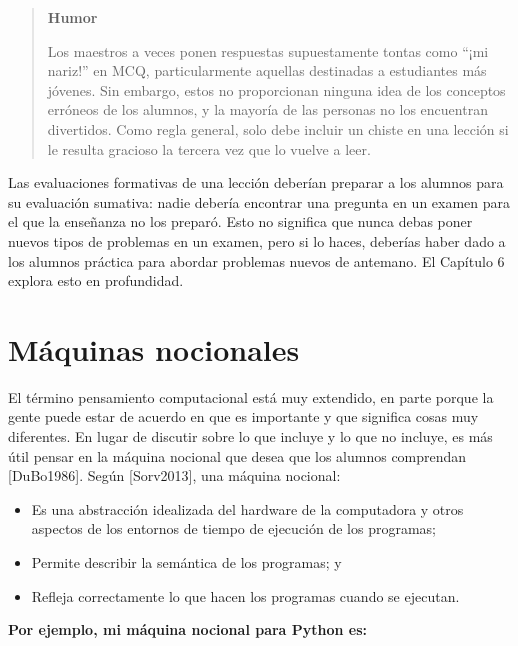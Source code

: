 \documentclass[
]{book}
\begin{document}
\begin{quote}
\textbf{Humor}

Los maestros a veces ponen respuestas supuestamente tontas como ``¡mi nariz!'' en MCQ, particularmente aquellas destinadas a estudiantes más jóvenes. Sin embargo, estos no proporcionan ninguna idea de los conceptos erróneos de los alumnos, y la mayoría de las personas no los encuentran divertidos. Como regla general, solo debe incluir un chiste en una lección si le resulta gracioso la tercera vez que lo vuelve a leer.
\end{quote}

Las evaluaciones formativas de una lección deberían preparar a los alumnos para su evaluación sumativa: nadie debería encontrar una pregunta en un examen para el que la enseñanza no los preparó. Esto no significa que nunca debas poner nuevos tipos de problemas en un examen, pero si lo haces, deberías haber dado a los alumnos práctica para abordar problemas nuevos de antemano. El Capítulo 6 explora esto en profundidad.

\hypertarget{muxe1quinas-nocionales}{%
\section{Máquinas nocionales}\label{muxe1quinas-nocionales}}

El término pensamiento computacional está muy extendido, en parte porque la gente puede estar de acuerdo en que es importante y que significa cosas muy diferentes. En lugar de discutir sobre lo que incluye y lo que no incluye, es más útil pensar en la máquina nocional que desea que los alumnos comprendan {[}DuBo1986{]}. Según {[}Sorv2013{]}, una máquina nocional:

\begin{itemize}
\item
  Es una abstracción idealizada del hardware de la computadora y otros aspectos de los entornos de tiempo de ejecución de los programas;
\item
  Permite describir la semántica de los programas; y
\item
  Refleja correctamente lo que hacen los programas cuando se ejecutan.
\end{itemize}

\textbf{Por ejemplo, mi máquina nocional para Python es:}
\end{document}
